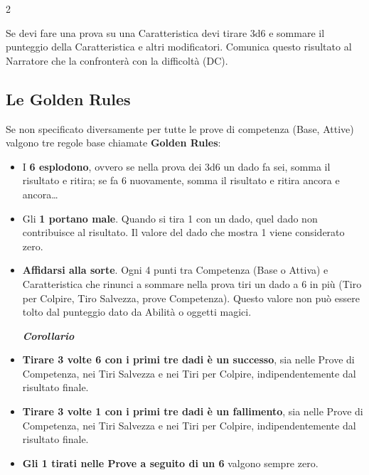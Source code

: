 \begin{multicols}{2}
\medskip

Se devi fare una prova su una Caratteristica devi tirare 3d6 e sommare il punteggio della Caratteristica e altri modificatori. Comunica questo risultato al Narratore che la confronterà con la difficoltà (DC).

\subsection{Le Golden Rules}\label{goldenrules}\hypertarget{goldenrules}{}

Se non specificato diversamente per tutte le prove di competenza (Base, Attive) valgono tre regole base  chiamate \textbf{Golden Rules}:

\begin{itemize}[leftmargin=*] \setlength{\itemsep}{0pt}
\item
I \textbf{6 esplodono}, ovvero se nella prova dei 3d6 un dado fa sei, somma il risultato e ritira; se fa 6 nuovamente, somma il risultato e ritira ancora e ancora…
\item
Gli \textbf{1 portano male}. Quando si tira 1 con un dado, quel dado non contribuisce al risultato. Il valore del dado che mostra 1 viene considerato zero.
\item
\textbf{Affidarsi alla sorte}. Ogni 4 punti tra Competenza (Base o Attiva) e Caratteristica che rinunci a sommare nella prova tiri un dado a 6 in più (Tiro per Colpire, Tiro Salvezza, prove Competenza). Questo valore non può essere tolto dal punteggio dato da Abilità o oggetti magici.



\begin{center}\textbf{\emph{Corollario}}\end{center}

\item \textbf{Tirare 3 volte 6 con i primi tre dadi è un successo}, sia nelle Prove di Competenza, nei Tiri Salvezza e nei Tiri per Colpire, indipendentemente dal risultato finale.

\item \textbf{Tirare 3 volte 1 con i primi tre dadi è un fallimento}, sia nelle Prove di Competenza, nei Tiri Salvezza e nei Tiri per Colpire, indipendentemente dal risultato finale. 

\item \textbf{Gli 1 tirati nelle Prove a seguito di un 6} valgono sempre zero.


\end{itemize}
\end{multicols}
